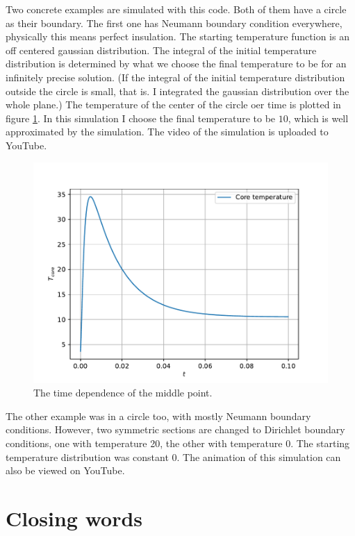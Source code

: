 \documentclass[pdftex,12pt,a4paper]{article}
\begin{document}
		Two concrete examples are simulated with this code. Both of them have a circle as their boundary. The first one has Neumann boundary condition everywhere, physically this means perfect insulation. The starting temperature function is an off centered gaussian distribution. The integral of the initial temperature distribution is determined by what we choose the final temperature to be for an infinitely precise solution. (If the integral of the initial temperature distribution outside the circle is small, that is. I integrated the gaussian distribution over the whole plane.) The temperature of the center of the circle oer time is plotted in figure \ref{timepdf}. In this simulation I choose the final temperature to be $10$, which is well approximated by the simulation. The video of the simulation is uploaded to YouTube. \cite{gaussian}
		\begin{figure}[H]
			\centering
			\includegraphics[scale=1]{./figs/time.pdf}
			\caption{The time dependence of the middle point.}
			\label{timepdf}
		\end{figure}
		
		The other example was in a circle too, with mostly Neumann boundary conditions. However, two symmetric sections are changed to Dirichlet boundary conditions, one with temperature 20, the other with temperature 0. The starting temperature distribution was constant 0. The animation of this simulation can also be viewed on YouTube. \cite{conduction}
	\section{Closing words}
		
	
    
\end{document}
